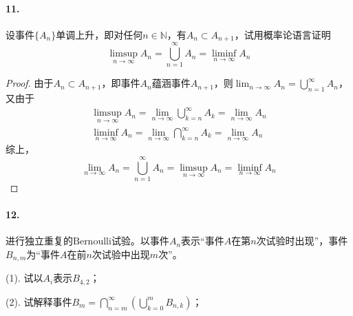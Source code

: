 \documentclass[12pt, a4paper, oneside]{ctexart}
\begin{document}
\paragraph{11.}设事件$\{A_n\}$单调上升，即对任何$n\in \mathbb{N}$，有$A_n\subset A_{n+1}$，试用概率论语言证明
\begin{equation*}
    \limsup_{n\rightarrow \infty}A_n=\bigcup_{n=1}^{\infty}A_n=\liminf_{n\rightarrow\infty}A_n
\end{equation*}
\begin{proof}
    由于$A_n\subset A_{n+1}$，即事件$A_n$蕴涵事件$A_{n+1}$，则$\lim_{n\rightarrow \infty}A_n = \bigcup_{n=1}^{\infty}A_n$，又由于
    \begin{equation*}
        \begin{aligned}
            \limsup_{n\rightarrow\infty}A_n=\lim_{n\rightarrow \infty}\bigcup_{k=n}^{\infty}A_k=\lim_{n\rightarrow \infty}A_n\\
            \liminf_{n\rightarrow\infty}A_n=\lim_{n\rightarrow \infty}\bigcap_{k=n}^{\infty}A_k=\lim_{n\rightarrow \infty}A_n
        \end{aligned}
    \end{equation*}
    综上，
    \begin{equation*}
        \lim_{n\rightarrow \infty}A_n=\bigcup_{n=1}^{\infty}A_n=\limsup_{n\rightarrow\infty}A_n=\liminf_{n\rightarrow\infty}A_n
    \end{equation*}

\end{proof}
\paragraph{12.}进行独立重复的$\text{Bernoulli}$试验。以事件$A_n$表示“事件$A$在第$n$次试验时出现”，事件$B_{n,m}$为“事件$A$在前$n$次试验中出现$m$次”。

(1). 试以$A_i$表示$B_{4,2}$；

(2). 试解释事件$B_m=\bigcap_{n=m}^{\infty}\left(\bigcup_{k=0}^mB_{n,k}\right)$；
\end{document}

